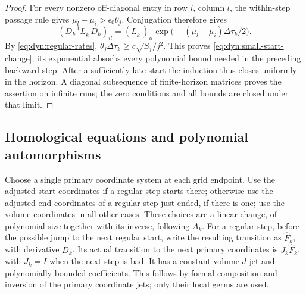 \documentclass[11pt]{article}
\theoremstyle{definition}
\theoremstyle{remark}
\numberwithin{equation}{section}
\begin{document}
\begin{proof}
For every nonzero off-diagonal entry in row $i$, column $l$, the
within-step passage rule gives $\mu_l-\mu_i>\epsilon_0\theta_j$.
Conjugation therefore gives
\[
 (D_k^{-1}L_k^+D_k)_{il}
 =(L_k^+)_{il}\exp\bigl(- (\mu_l-\mu_i)\Delta\tau_k/2\bigr).
\]
By \eqref{eq:dyn:regular-rates},
$\theta_j\Delta\tau_k\ge c\sqrt{S_j}/j^2$.
This proves \eqref{eq:dyn:small-start-change}; its exponential absorbs
every polynomial bound needed in the preceding backward step.
After a sufficiently late start the induction thus closes uniformly
in the horizon.  A diagonal subsequence of finite-horizon matrices
proves the assertion on infinite runs; the zero conditions and all
bounds are closed under that limit.
\end{proof}

\subsection{Homological equations and polynomial automorphisms}

Choose a single primary coordinate system at each grid endpoint.
Use the adjusted start coordinates if a regular step starts there;
otherwise use the adjusted end coordinates of a regular step just
ended, if there is one; use the volume coordinates in all other cases.
These choices are a linear change, of polynomial size together with
its inverse, following $A_k$.  For a regular step, before the possible
jump to the next regular start, write the resulting transition as
$\widehat F_k$, with derivative $D_k$.  Its actual transition to the
next primary coordinates is $J_k\widehat F_k$, with $J_k=I$ when the
next step is bad.  It has a constant-volume $d$-jet and polynomially
bounded coefficients.  This follows by formal composition and
inversion of the primary coordinate jets; only their local germs are
used.
\end{document}
